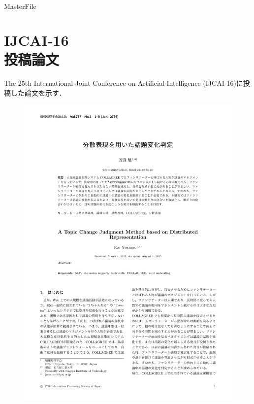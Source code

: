 \expandafter\ifx\csname MasterFile\endcsname\relax
\def\SubFile{hoge}


\fi
\cleardoublepage
\chapter[IJCAI-16投稿論文]{IJCAI-16\\投稿論文}
The 25th International Joint Conference on Artificial Intelligence (IJCAI-16)に投稿した論文を示す．

\begin{figure}
	\centering
	\includegraphics[width=\linewidth,page=1]{../C.IPSJ80/jsample-submit.pdf}
\end{figure}

